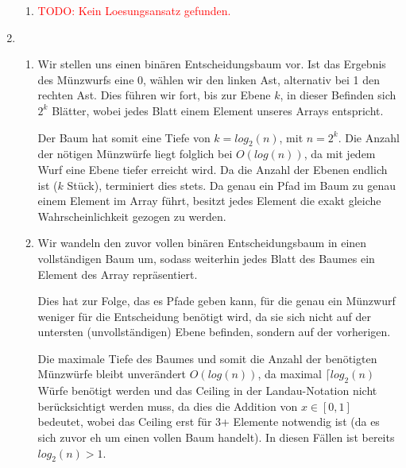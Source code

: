 \documentclass{article}
\begin{document}
\begin{enumerate}[\bfseries1.]
\begin{enumerate}
            \item \textcolor{red}{TODO: Kein Loesungsansatz gefunden.}
        \end{enumerate}
    
    \item
        \begin{enumerate}
            \item
                Wir stellen uns einen binären Entscheidungsbaum vor. Ist das
                Ergebnis des Münzwurfs eine 0, wählen wir den linken Ast,
                alternativ bei 1 den rechten Ast. Dies führen wir fort, bis zur 
                Ebene $k$, in dieser Befinden sich $2^k$ Blätter, wobei jedes
                Blatt einem Element unseres Arrays entspricht.
                
                Der Baum hat somit eine Tiefe von $k = log_2(n)$, mit $n=2^k$.
                Die Anzahl der nötigen Münzwürfe liegt folglich bei $O(log(n))$,
                da mit jedem Wurf eine Ebene tiefer erreicht wird. Da die Anzahl
                der Ebenen endlich ist ($k$ Stück), terminiert dies stets. Da
                genau ein Pfad im Baum zu genau einem Element im Array führt,
                besitzt jedes Element die exakt gleiche Wahrscheinlichkeit
                gezogen zu werden.
            
            \item
                Wir wandeln den zuvor vollen binären Entscheidungsbaum in einen
                vollständigen Baum um, sodass weiterhin jedes Blatt des Baumes
                ein Element des Array repräsentiert.
                
                Dies hat zur Folge, das es Pfade geben kann, für die genau ein
                Münzwurf weniger für die Entscheidung benötigt wird, da sie sich
                nicht auf der untersten (unvollständigen) Ebene befinden,
                sondern auf der vorherigen.
                
                Die maximale Tiefe des Baumes und somit die Anzahl der
                benötigten Münzwürfe bleibt unverändert $O(log(n))$, da maximal 
                $\lceil log_2(n)$ Würfe benötigt werden und das Ceiling in der
                Landau-Notation nicht berücksichtigt werden muss, da dies die
                Addition von $x \in [0,1]$ bedeutet, wobei das Ceiling erst für
                3+ Elemente notwendig ist (da es sich zuvor eh um einen vollen
                Baum handelt). In diesen Fällen ist bereits $log_2(n) > 1$.


\end{enumerate}
\end{enumerate}
\end{document}
